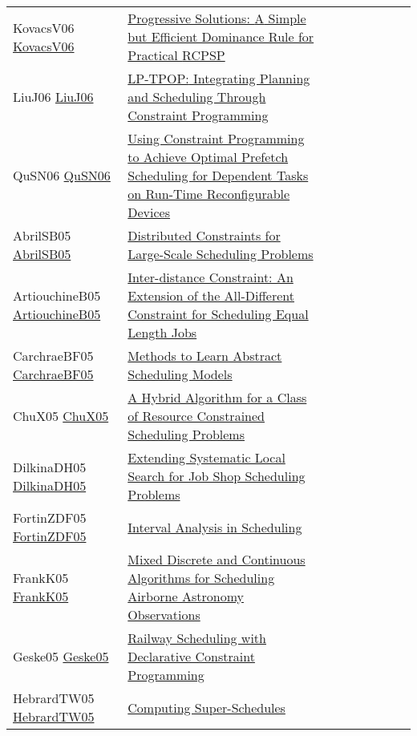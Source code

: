 {\begin{longtable}{p{3cm}p{7cm}lllllll}
KovacsV06 \href{https://doi.org/10.1007/11757375\_13}{KovacsV06} &  \href{papers/KovacsV06.pdf}{Progressive Solutions: {A} Simple but Efficient Dominance Rule for Practical {RCPSP}} &  &  &  &  &  &  & \\
LiuJ06 \href{https://doi.org/10.1007/11801603\_92}{LiuJ06} &  \href{papers/LiuJ06.pdf}{{LP-TPOP:} Integrating Planning and Scheduling Through Constraint Programming} &  &  &  &  &  &  & \\
QuSN06 \href{https://doi.org/10.1109/ISSOC.2006.321973}{QuSN06} &  \href{papers/QuSN06.pdf}{Using Constraint Programming to Achieve Optimal Prefetch Scheduling for Dependent Tasks on Run-Time Reconfigurable Devices} &  &  &  &  &  &  & \\
AbrilSB05 \href{https://doi.org/10.1007/11564751\_75}{AbrilSB05} &  \href{papers/AbrilSB05.pdf}{Distributed Constraints for Large-Scale Scheduling Problems} &  &  &  &  &  &  & \\
ArtiouchineB05 \href{https://doi.org/10.1007/11564751\_8}{ArtiouchineB05} &  \href{papers/ArtiouchineB05.pdf}{Inter-distance Constraint: An Extension of the All-Different Constraint for Scheduling Equal Length Jobs} &  &  &  &  &  &  & \\
CarchraeBF05 \href{https://doi.org/10.1007/11564751\_80}{CarchraeBF05} &  \href{papers/CarchraeBF05.pdf}{Methods to Learn Abstract Scheduling Models} &  &  &  &  &  &  & \\
ChuX05 \href{https://doi.org/10.1007/11493853\_10}{ChuX05} &  \href{papers/ChuX05.pdf}{A Hybrid Algorithm for a Class of Resource Constrained Scheduling Problems} &  &  &  &  &  &  & \\
DilkinaDH05 \href{https://doi.org/10.1007/11564751\_60}{DilkinaDH05} &  \href{papers/DilkinaDH05.pdf}{Extending Systematic Local Search for Job Shop Scheduling Problems} &  &  &  &  &  &  & \\
FortinZDF05 \href{https://doi.org/10.1007/11564751\_19}{FortinZDF05} &  \href{papers/FortinZDF05.pdf}{Interval Analysis in Scheduling} &  &  &  &  &  &  & \\
FrankK05 \href{https://doi.org/10.1007/11493853\_15}{FrankK05} &  \href{papers/FrankK05.pdf}{Mixed Discrete and Continuous Algorithms for Scheduling Airborne Astronomy Observations} &  &  &  &  &  &  & \\
Geske05 \href{https://doi.org/10.1007/11963578\_10}{Geske05} &  \href{papers/Geske05.pdf}{Railway Scheduling with Declarative Constraint Programming} &  &  &  &  &  &  & \\
HebrardTW05 \href{https://doi.org/10.1007/11564751\_117}{HebrardTW05} &  \href{papers/HebrardTW05.pdf}{Computing Super-Schedules} &  &  &  &  &  &  & \\

\end{longtable}}

